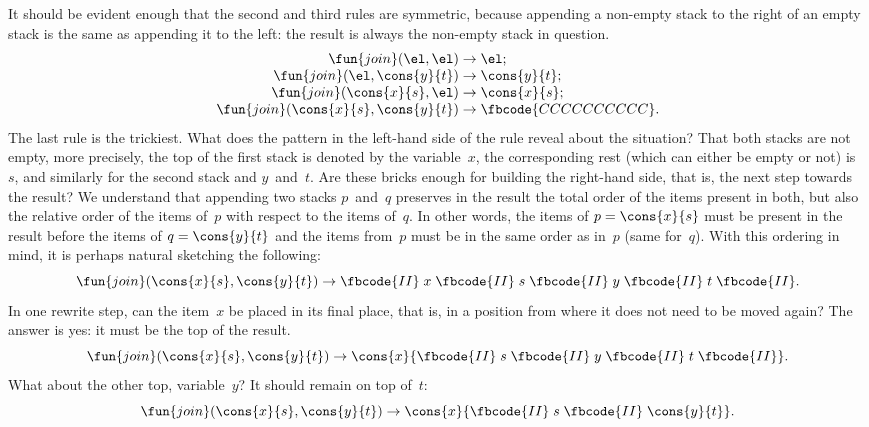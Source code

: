 It should be evident enough that the second and third rules are
symmetric, because appending a non\hyp{}empty stack to the right of an
empty stack is the same as appending it to the left: the result is
always the non\hyp{}empty stack in question.
\begin{equation*}
\begin{array}{r@{\;}l@{\;}l}
\fun{join}(\el,\el) & \rightarrow & \el;\\
\fun{join}(\el,\cons{y}{t}) & \rightarrow & \cons{y}{t};\\
\fun{join}(\cons{x}{s},\el) & \rightarrow & \cons{x}{s};\\
\fun{join}(\cons{x}{s},\cons{y}{t}) & \rightarrow & \fbcode{CCCCCCCCCC}.
\end{array}
\end{equation*}
The last rule is the trickiest. What does the pattern in the
left\hyp{}hand side of the rule reveal about the situation? That both
stacks are not empty, more precisely, the top of the first stack is
denoted by the variable~\(x\), the corresponding rest (which can
either be empty or not) is~\(s\), and similarly for the second stack
and \(y\)~and~\(t\). Are these bricks enough for building the
right\hyp{}hand side, that is, the next step towards the result? We
understand that appending two stacks \(p\)~and~\(q\) preserves in the
result the total order of the items present in both, but also the
relative order of the items of~\(p\) with respect to the items
of~\(q\). In other words, the items of \(p=\cons{x}{s}\) must be
present in the result before the items of \(q=\cons{y}{t}\) and the
items from~\(p\) must be in the same order as in~\(p\) (same
for~\(q\)). With this ordering in mind, it is perhaps natural
sketching the following:
\begin{equation*}
\fun{join}(\cons{x}{s},\cons{y}{t}) \rightarrow \fbcode{II} \; x \;
\fbcode{II} \; s \; \fbcode{II} \; y \; \fbcode{II} \; t \; \fbcode{II}.
\end{equation*}
In one rewrite step, can the item~\(x\) be placed in its final place,
that is, in a position from where it does not need to be moved again?
The answer is yes: it must be the top of the result.
\begin{equation*}
\fun{join}(\cons{x}{s},\cons{y}{t}) \rightarrow \cons{x}{\fbcode{II}
  \; s \; \fbcode{II} \; y \; \fbcode{II} \; t \; \fbcode{II}}.
\end{equation*}
What about the other top, variable~\(y\)? It should remain on
top of~\(t\):
\begin{equation*}
\fun{join}(\cons{x}{s},\cons{y}{t}) \rightarrow \cons{x}{\fbcode{II}
  \; s \; \fbcode{II} \; \cons{y}{t}}.
\end{equation*}
